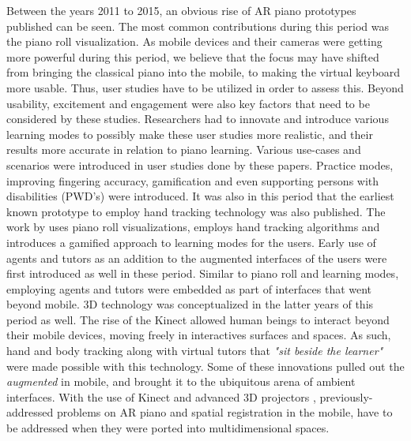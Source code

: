 \documentclass[sigchi, review]{acmart}
\begin{document}
Between the years 2011 to 2015, an obvious rise of AR piano prototypes published can be seen. The most common contributions during this period was the piano roll visualization. As mobile devices and their cameras were getting more powerful during this period, we believe that the focus may have shifted from bringing the classical piano into the mobile, to making the virtual keyboard more usable. Thus, user studies have to be utilized in order to assess this. Beyond usability, excitement and engagement were also key factors that need to be considered by these studies. Researchers had to innovate and introduce various learning modes to possibly make these user studies more realistic, and their results more accurate in relation to piano learning. Various use-cases and scenarios were introduced in user studies done by these papers. Practice modes, improving fingering accuracy, gamification and even supporting persons with disabilities (PWD's) were introduced. It was also in this period that the earliest known prototype to employ hand tracking \cite{huang2011piano} technology was also published. The work by \citet{weing2013piano} uses piano roll visualizations, employs hand tracking algorithms and introduces a gamified approach to learning modes for the users. Early use of agents and tutors as an addition to the augmented interfaces of the users were first introduced as well in these period. Similar to piano roll and learning modes, employing agents and tutors were embedded as part of interfaces that went beyond mobile. 3D technology was conceptualized in the latter years of this period as well. The rise of the Kinect \cite{zhang2012microsoft} allowed human beings to interact beyond their mobile devices, moving freely in interactives surfaces and spaces. As such, hand and body tracking along with virtual tutors that \textit{"sit beside the learner"} were made possible with this technology. Some of these innovations pulled out the \textit{augmented} in mobile, and brought it to the ubiquitous arena of ambient interfaces. With the use of Kinect and advanced 3D projectors \cite{yang2012augmented}, previously-addressed problems on AR piano and spatial registration in the mobile, have to be addressed when they were ported into multidimensional spaces. 
\end{document}
